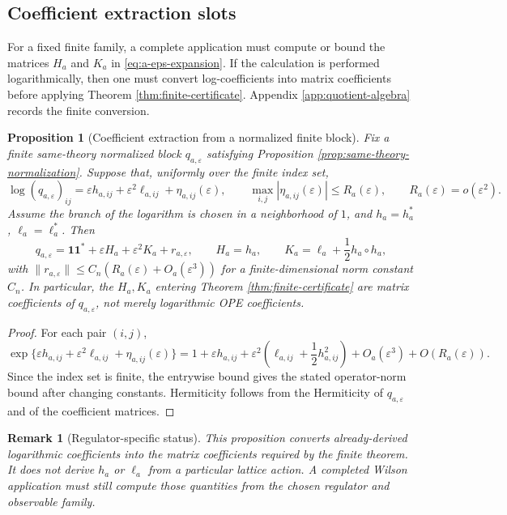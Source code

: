 \documentclass[11pt]{article}
\newtheorem{proposition}[theorem]{Proposition}
\newtheorem{remark}[theorem]{Remark}
\newcommand{\one}{\mathbf 1}
\newcommand{\eps}{\varepsilon}
\newcommand{\Had}{\circ}
\newcommand{\norm}[1]{\lVert #1\rVert}
\begin{document}
\subsection{Coefficient extraction slots}

For a fixed finite family, a complete application must compute or bound the matrices \(H_a\) and \(K_a\) in \eqref{eq:a-eps-expansion}.  If the calculation is performed logarithmically, then one must convert log-coefficients into matrix coefficients before applying Theorem \ref{thm:finite-certificate}.  Appendix \ref{app:quotient-algebra} records the finite conversion.

\begin{proposition}[Coefficient extraction from a normalized finite block]
\label{prop:HK-extraction}
Fix a finite same-theory normalized block \(q_{a,\eps}\) satisfying Proposition \ref{prop:same-theory-normalization}.  Suppose that, uniformly over the finite index set,
\[
  \log(q_{a,\eps})_{ij}
  =
  \eps h_{a,ij}
  +
  \eps^2\ell_{a,ij}
  +
  \eta_{a,ij}(\eps),
  \qquad
  \max_{i,j}|\eta_{a,ij}(\eps)|\le R_a(\eps),
  \qquad
  R_a(\eps)=o(\eps^2).
\]
Assume the branch of the logarithm is chosen in a neighborhood of \(1\), and \(h_a=h_a^*\), \(\ell_a=\ell_a^*\).  Then
\[
  q_{a,\eps}
  =
  \one\one^*
  +\eps H_a
  +\eps^2K_a
  +r_{a,\eps},
  \qquad
  H_a=h_a,
  \qquad
  K_a=\ell_a+\frac12h_a\Had h_a ,
\]
with \(\norm{r_{a,\eps}}\le C_n(R_a(\eps)+O_a(\eps^3))\) for a finite-dimensional norm constant \(C_n\).  In particular, the \(H_a,K_a\) entering Theorem \ref{thm:finite-certificate} are matrix coefficients of \(q_{a,\eps}\), not merely logarithmic OPE coefficients.
\end{proposition}

\begin{proof}
For each pair \((i,j)\),
\[
  \exp\{\eps h_{a,ij}+\eps^2\ell_{a,ij}+\eta_{a,ij}(\eps)\}
  =
  1+\eps h_{a,ij}
  +\eps^2\left(\ell_{a,ij}+\frac12h_{a,ij}^2\right)
  +O_a(\eps^3)+O(R_a(\eps)).
\]
Since the index set is finite, the entrywise bound gives the stated operator-norm bound after changing constants.  Hermiticity follows from the Hermiticity of \(q_{a,\eps}\) and of the coefficient matrices.
\end{proof}

\begin{remark}[Regulator-specific status]
This proposition converts already-derived logarithmic coefficients into the matrix coefficients required by the finite theorem.  It does not derive \(h_a\) or \(\ell_a\) from a particular lattice action.  A completed Wilson application must still compute those quantities from the chosen regulator and observable family.
\end{remark}
\end{document}
